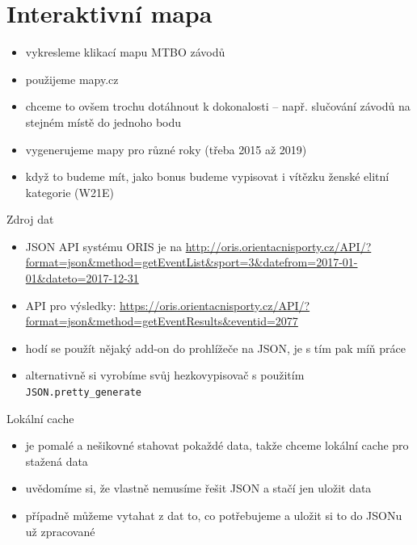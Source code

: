 \documentclass{beamer}
\begin{document}
\section{Interaktivní mapa}

\begin{frame}{}
  \begin{itemize}
    \item vykresleme klikací mapu MTBO závodů
    \item použijeme mapy.cz
    \item chceme to ovšem trochu dotáhnout k dokonalosti – např. slučování závodů na stejném místě do jednoho bodu
    \item vygenerujeme mapy pro různé roky (třeba 2015 až 2019)
    \item když to budeme mít, jako bonus budeme vypisovat i vítězku ženské elitní kategorie (W21E)
  \end{itemize}
\end{frame}

\begin{frame}{Zdroj dat}
  \begin{itemize}
    \item JSON API systému ORIS je na \url{http://oris.orientacnisporty.cz/API/?format=json\&method=getEventList\&sport=3\&datefrom=2017-01-01\&dateto=2017-12-31}
    \item API pro výsledky: \url{https://oris.orientacnisporty.cz/API/?format=json&method=getEventResults&eventid=2077}
    \item hodí se použít nějaký add-on do prohlížeče na JSON, je s tím pak míň práce
    \item alternativně si vyrobíme svůj hezkovypisovač s použitím \texttt{JSON.pretty\_generate}
  \end{itemize}
\end{frame}

\begin{frame}{Lokální cache}
  \begin{itemize}
    \item je pomalé a nešikovné stahovat pokaždé data, takže chceme lokální cache pro stažená data
    \item uvědomíme si, že vlastně nemusíme řešit JSON a stačí jen uložit data
    \item případně můžeme vytahat z dat to, co potřebujeme a uložit si to do JSONu už zpracované
  \end{itemize}
\end{frame}
\end{document}
